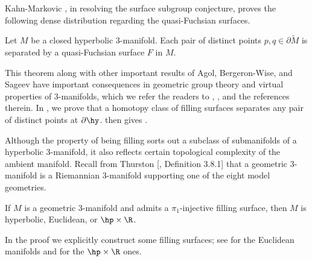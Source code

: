 Kahn-Markovic \cite{kmImmersingAlmostGeodesic}, in resolving the surface subgroup conjecture, proves the following dense distribution regarding the quasi-Fuchsian surfaces. 

\begin{theorem}\label{separation of geodesics}
	Let $M$ be a closed hyperbolic $3$-manifold. Each pair of distinct points $p, q \in \partial \widetilde{M}$ is separated by a quasi-Fuchsian surface $F$ in $ M$. 
\end{theorem}
This theorem along with other important results of Agol, Bergeron-Wise, and Sageev have important consequences in geometric group theory and virtual properties of $3$-manifolds, which we refer the readers to \cite{bwBoundaryCriterionCubulation}, \cite{afw3manifoldGroups}, and the references therein. 
In , we prove that a homotopy class of filling surfaces separates any pair of distinct points at $\partial \hy$.  then gives . 

Although the property of being filling sorts out a subclass of submanifolds of a hyperbolic $3$-manifold, it also reflects certain topological complexity of the ambient manifold. Recall from Thurston [, Definition 3.8.1] that a geometric $3$-manifold is a Riemannian $3$-manifold supporting one of the eight model geometries. 
\begin{theorem}\label{filling 3-manifold is hyperbolic}
	If $M$ is a geometric $3$-manifold and admits a $\pi_1$-injective filling surface, then $M$ is hyperbolic, Euclidean, or $\hp \times \R$.
\end{theorem}
In the proof we explicitly construct some filling surfaces; see  for the Euclidean manifolds and  for the $\hp \times \R$ ones.


